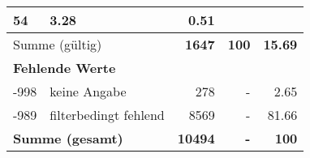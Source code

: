 \begin{longtable}{lXrrr}
       \num{54} &
       \num[round-mode=places,round-precision=2]{3,28} &
         \num[round-mode=places,round-precision=2]{0,51} \\
     \midrule
     \multicolumn{2}{l}{Summe (gültig)} &
       \textbf{\num{1647}} &
     \textbf{100} &
       \textbf{\num[round-mode=places,round-precision=2]{15,69}} \\
     \multicolumn{5}{l}{\textbf{Fehlende Werte}}\\
       -998 &
       keine Angabe &
         \num{278} &
        - &
         \num[round-mode=places,round-precision=2]{2,65} \\
       -989 &
       filterbedingt fehlend &
         \num{8569} &
        - &
         \num[round-mode=places,round-precision=2]{81,66} \\
     \midrule
     \multicolumn{2}{l}{\textbf{Summe (gesamt)}} &
          \textbf{\num{10494}} &
        \textbf{-} &
        \textbf{100} \\
     \bottomrule
     \end{longtable}
     
